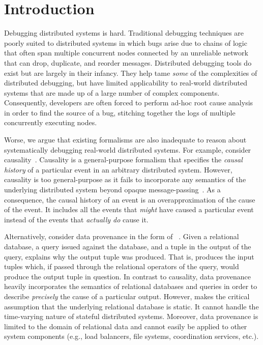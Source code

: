 \section{Introduction}
Debugging distributed systems is hard. Traditional debugging techniques are
poorly suited to distributed systems in which bugs arise due to chains of logic
that often span multiple concurrent nodes connected by an unreliable network that can
drop, duplicate, and reorder messages. Distributed debugging tools do
exist but are largely in their infancy. They help tame \emph{some} of the
complexities of distributed debugging, but have limited applicability to
real-world distributed systems that are made up of a large number of complex
components. Consequently, developers are often forced to perform ad-hoc root
cause analysis in order to find the source of a bug, stitching together the
logs of multiple concurrently executing nodes.

Worse, we argue that existing formalisms are also inadequate to reason about
systematically debugging real-world distributed systems. For example, consider
causality~\cite{lamport1978time}. Causality is a general-purpose formalism that
specifies the \emph{causal history} of a particular event in an arbitrary
distributed system. However, causality is too general-purpose as it fails to
incorporate any semantics of the underlying distributed system beyond opaque
message-passing~\cite{bailis2012potential}. As a consequence, the causal
history of an event is an overapproximation of the cause of the event. It
includes all the events that \emph{might} have caused a particular event
instead of the events that \emph{actually do} cause it.

Alternatively, consider data provenance in the form of
\emph{\whyprovenance{}}~\cite{cheney2009provenance, buneman2001and}. Given a
relational database, a query issued against the database, and a tuple in the
output of the query, \whyprovenance{} explains why the output tuple was
produced. That is, \whyprovenance{} produces the input tuples which, if passed
through the relational operators of the query, would produce the output tuple
in question. In contrast to causality, data provenance heavily incorporates the
semantics of relational databases and queries in order to describe
\emph{precisely} the cause of a particular output. However, \whyprovenance{}
makes the critical assumption that the underlying relational database is
static. It cannot handle the time-varying nature of stateful distributed
systems. Moreover, data provenance is limited to the domain of relational data
and cannot easily be applied to other system components (e.g., load balancers,
file systems, coordination services, etc.).

